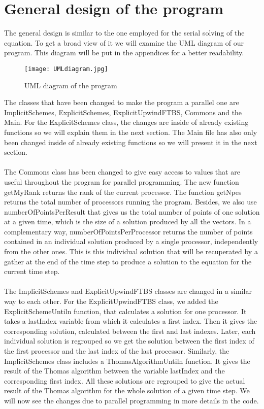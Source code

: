\documentclass [10 pt, a4 paper]{report}
\begin{document}
\section{General design of the program}
The general design is similar to the one employed for the serial solving of the equation. To get a broad view of it we will examine the UML diagram of our program. This diagram will be put in the appendices for a better readability.

\begin{figure}[!htbp]
\centering
\texttt{[image: UMLdiagram.jpg]}
\caption{\label{fig:image} UML diagram of the program}
\end{figure}

\noindent
The classes that have been changed to make the program a parallel one are ImplicitSchemes, ExplicitSchemes, ExplicitUpwindFTBS, Commons and the Main. For the ExplicitSchemes class, the changes are inside of already existing functions so we will explain them in the next section. The Main file has also only been changed inside of already existing functions so we will present it in the next section.
\\ \\
The Commons class has been changed to give easy access to values that are useful throughout the program for parallel programming. The new function getMyRank returns the rank of the current processor. The function getNpes returns the total number of processors running the program. Besides, we also use numberOfPointsPerResult that gives us the total number of points of one solution at a given time, which is the size of a solution produced by all the vectors. In a complementary way, numberOfPointsPerProcessor returns the number of points contained in an individual solution produced by a single processor, independently from the other ones. This is this individual solution that will be recuperated by a gather at the end of the time step to produce a solution to the equation for the current time step.
\\ \\
The ImplicitSchemes and ExplicitUpwindFTBS classes are changed in a similar way to each other. For the ExplicitUpwindFTBS class, we added the ExplicitSchemeUntiln function, that calculates a solution for one processor. It takes a lastIndex variable from which it calculates a first index. Then it gives the corresponding solution, calculated between the first and last indexes. Later, each individual solution is regrouped so we get the solution between the first index of the first processor and the last index of the last processor. Similarly, the ImplicitSchemes class includes a ThomasAlgorithmUntiln function. It gives the result of the Thomas algorithm between the variable lastIndex and the corresponding first index. All these solutions are regrouped to give the actual result of the Thomas algorithm for the whole solution of a given time step. We will now see the changes due to parallel programming in more details in the code.
\end{document}
